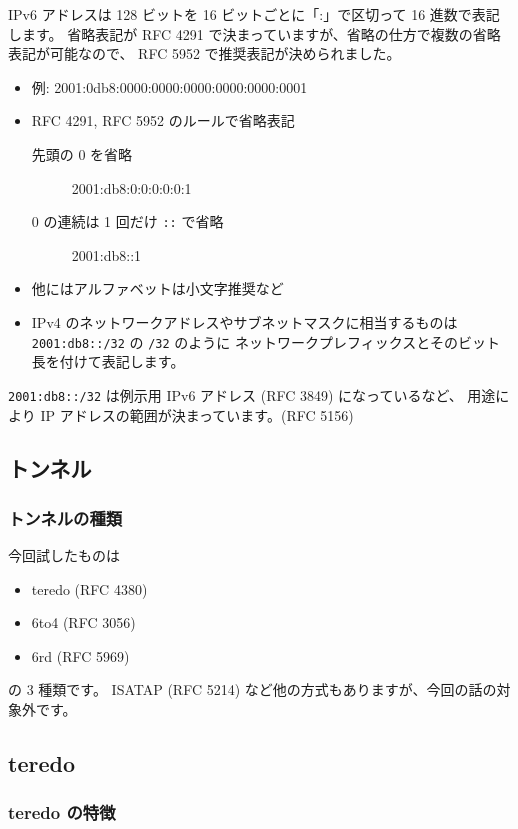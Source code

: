 \documentclass[mingoth,a4paper]{jsarticle}
\begin{document}
IPv6 アドレスは 128 ビットを 16 ビットごとに「:」で区切って 16 進数で表記します。
省略表記が RFC 4291 で決まっていますが、省略の仕方で複数の省略表記が可能なので、
RFC 5952 で推奨表記が決められました。

\begin{itemize}
\item 例: 2001:0db8:0000:0000:0000:0000:0000:0001
\item RFC 4291, RFC 5952 のルールで省略表記

\begin{description}
\item[先頭の 0 を省略] 2001:db8:0:0:0:0:0:1
\item[0 の連続は 1 回だけ \texttt{::} で省略] 2001:db8::1
\end{description}

\item 他にはアルファベットは小文字推奨など
\item IPv4 のネットワークアドレスやサブネットマスクに相当するものは
  \texttt{2001:db8::/32} の \texttt{/32} のように
  ネットワークプレフィックスとそのビット長を付けて表記します。
\end{itemize}


\texttt{2001:db8::/32} は例示用 IPv6 アドレス (RFC 3849) になっているなど、
用途により IP アドレスの範囲が決まっています。(RFC 5156)
\subsection{トンネル}
\subsubsection{トンネルの種類}

今回試したものは

\begin{itemize}
\item teredo (RFC 4380)
\item 6to4 (RFC 3056)
\item 6rd (RFC 5969)
\end{itemize}


の 3 種類です。
ISATAP (RFC 5214) など他の方式もありますが、今回の話の対象外です。
\subsection{teredo}
\subsubsection{teredo の特徴}
\end{document}
